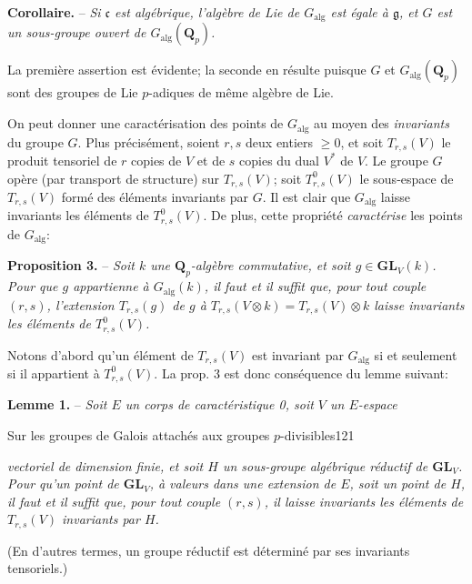 \textbf{Corollaire.} -- \textit{Si $\mathfrak c$ est algébrique, l'algèbre de Lie de $G_{\mathrm{alg}}$ est égale à $\mathfrak g$, et $G$ est un sous-groupe ouvert de $G_{\mathrm{alg}}(\mathbf Q_p)$.}

La première assertion est évidente; la seconde en résulte puisque $G$ et $G_{\mathrm{alg}}(\mathbf Q_p)$ sont des groupes de Lie $p$-adiques de même algèbre de Lie.

On peut donner une caractérisation des points de $G_{\mathrm{alg}}$ au moyen des \textit{invariants} du groupe $G$. Plus précisément, soient $r,s$ deux entiers $\geq0$, et soit $T_{r,s}(V)$ le produit tensoriel de $r$ copies de $V$ et de $s$ copies du dual $V^*$ de $V$. Le groupe $G$ opère (par transport de structure) sur $T_{r,s}(V)$; soit $T^0_{r,s}(V)$ le sous-espace de $T_{r,s}(V)$ formé des éléments invariants par $G$. Il est clair que $G_{\mathrm{alg}}$ laisse invariants les éléments de $T^0_{r,s}(V)$. De plus, cette propriété \textit{caractérise} les points de $G_{\mathrm{alg}}$:

\textbf{Proposition 3.} -- \textit{Soit $k$ une $\mathbf Q_p$-algèbre commutative, et soit $g\in\mathbf{GL}_V(k)$. Pour que $g$ appartienne à $G_{\mathrm{alg}}(k)$, il faut et il suffit que, pour tout couple $(r,s)$, l'extension $T_{r,s}(g)$ de $g$ à $T_{r,s}(V\otimes k)=T_{r,s}(V)\otimes k$ laisse invariants les éléments de $T^0_{r,s}(V)$.}

Notons d'abord qu'un élément de $T_{r,s}(V)$ est invariant par $G_{\mathrm{alg}}$ si et seulement si il appartient à $T^0_{r,s}(V)$. La prop. 3 est donc conséquence du lemme suivant:

\textbf{Lemme 1.} -- \textit{Soit $E$ un corps de caractéristique 0, soit $V$ un $E$-espace}

\begin{center}Sur les groupes de Galois attachés aux groupes $p$-divisibles\hfill121\end{center}

\textit{vectoriel de dimension finie, et soit $H$ un sous-groupe algébrique réductif de $\mathbf{GL}_V$. Pour qu'un point de $\mathbf{GL}_V$, à valeurs dans une extension de $E$, soit un point de $H$, il faut et il suffit que, pour tout couple $(r,s)$, il laisse invariants les éléments de $T_{r,s}(V)$ invariants par $H$.}

(En d'autres termes, un groupe réductif est déterminé par ses invariants tensoriels.)

